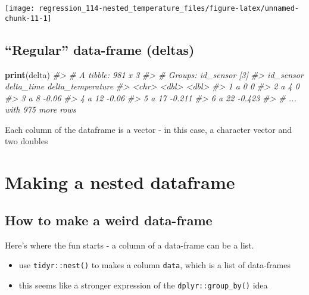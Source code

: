 \documentclass[]{book}
\newenvironment{Shaded}{\begin{snugshade}}{\end{snugshade}}
\newcommand{\CommentTok}[1]{\textcolor[rgb]{0.56,0.35,0.01}{\textit{#1}}}
\newcommand{\KeywordTok}[1]{\textcolor[rgb]{0.13,0.29,0.53}{\textbf{#1}}}
\newcommand{\NormalTok}[1]{#1}
\begin{document}
\begin{center}\texttt{[image: regression\_114-nested\_temperature\_files/figure-latex/unnamed-chunk-11-1]} \end{center}

\hypertarget{regular-data-frame-deltas}{%
\subsection{``Regular'' data-frame (deltas)}\label{regular-data-frame-deltas}}

\begin{Shaded}
\begin{Highlighting}[]
\KeywordTok{print}\NormalTok{(delta)}
\CommentTok{#> # A tibble: 981 x 3}
\CommentTok{#> # Groups:   id_sensor [3]}
\CommentTok{#>   id_sensor delta_time delta_temperature}
\CommentTok{#>   <chr>          <dbl>             <dbl>}
\CommentTok{#> 1 a                  0             0    }
\CommentTok{#> 2 a                  4             0    }
\CommentTok{#> 3 a                  8            -0.06 }
\CommentTok{#> 4 a                 12            -0.06 }
\CommentTok{#> 5 a                 17            -0.211}
\CommentTok{#> 6 a                 22            -0.423}
\CommentTok{#> # ... with 975 more rows}
\end{Highlighting}
\end{Shaded}

Each column of the dataframe is a vector - in this case, a character vector and two doubles

\hypertarget{making-a-nested-dataframe}{%
\section{Making a nested dataframe}\label{making-a-nested-dataframe}}

\hypertarget{how-to-make-a-weird-data-frame}{%
\subsection{How to make a weird data-frame}\label{how-to-make-a-weird-data-frame}}

Here's where the fun starts - a column of a data-frame can be a list.

\begin{itemize}
\item
  use \texttt{tidyr::nest()} to makes a column \texttt{data}, which is a list of data-frames
\item
  this seems like a stronger expression of the \texttt{dplyr::group\_by()} idea
\end{itemize}
\end{document}
